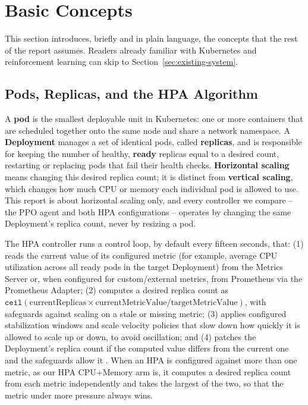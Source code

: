 \section{Basic Concepts}
\label{sec:intro-basics}

This section introduces, briefly and in plain language, the concepts that
the rest of the report assumes. Readers already familiar with Kubernetes and
reinforcement learning can skip to Section~\ref{sec:existing-system}.

\subsection{Pods, Replicas, and the HPA Algorithm}

A \textbf{pod} is the smallest deployable unit in Kubernetes: one or more
containers that are scheduled together onto the same node and share a
network namespace. A \textbf{Deployment} manages a set of identical pods,
called \textbf{replicas}, and is responsible for keeping the number of
healthy, \textbf{ready} replicas equal to a desired count, restarting or
replacing pods that fail their health checks. \textbf{Horizontal scaling}
means changing this desired replica count; it is distinct from
\textbf{vertical scaling}, which changes how much CPU or memory each
individual pod is allowed to use. This report is about horizontal scaling
only, and every controller we compare -- the PPO agent and both HPA
configurations -- operates by changing the same Deployment's replica count,
never by resizing a pod.

The HPA controller runs a control loop, by default every fifteen seconds,
that: (1) reads the current value of its configured metric (for example,
average CPU utilization across all ready pods in the target Deployment) from
the Metrics Server or, when configured for custom/external metrics, from
Prometheus via the Prometheus Adapter; (2) computes a desired replica count
as $\mathtt{ceil}(\text{currentReplicas} \times \text{currentMetricValue} /
\text{targetMetricValue})$, with safeguards against scaling on a stale or
missing metric; (3) applies configured stabilization windows and scale
velocity policies that slow down how quickly it is allowed to scale up or
down, to avoid oscillation; and (4) patches the Deployment's replica count
if the computed value differs from the current one and the safeguards allow
it \cite{k8s_hpa_docs}. When an HPA is configured against more than one
metric, as our HPA CPU+Memory arm is, it computes a desired replica count
from each metric independently and takes the largest of the two, so that
the metric under more pressure always wins.

